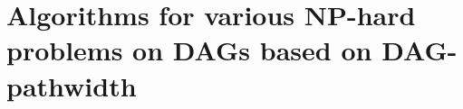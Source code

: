 \documentclass[runningheads]{llncs}
\theoremstyle{plain}
\theoremstyle{definition}
\begin{document}
\begin{comment}
    The pebbling number of $G$ $(\mathsf{Peb}(G))$ is the minimum $space$ over all strategies of $G$.
\end{definition}

For general DAGs, the problem of computing the pebbling number is PSPACE-complete [\cite{art14}]. The Black Pebbling game is used in blockchain technology known as Proof of Space [\cite{art15}]. Proof of Space is a method to prove the amount of free disk space held, where the input DAG corresponds to the free disk space. Moreover, the pebbling number corresponds to the amount of memory used simultaneously. A larger pebbling number indicates greater memory or data usage, making the proof more challenging and thus indicating higher security of the proof.

Additionally, the one-shot Black Pebbling (one-shot BP) is defined by adding the following rule to the Black Pebbling game:

\begin{description}
    \item[Rule 5] Each vertex of the DAG $G$ is pebbled only once.
\end{description}

The pebbling number for one-shot BP can also be defined similarly. For general DAGs, the problem of computing the pebbling number for one-shot BP is NP-hard [\cite{art16}]. In Section 4.3, we demonstrate that one-shot BP is equivalent to the problem of constructing a nice DAG-path-decomposition on DAGs.
\end{comment}






















\section{Algorithms for various NP-hard problems on DAGs based on DAG-pathwidth}\label{chapter3}

\end{document}
